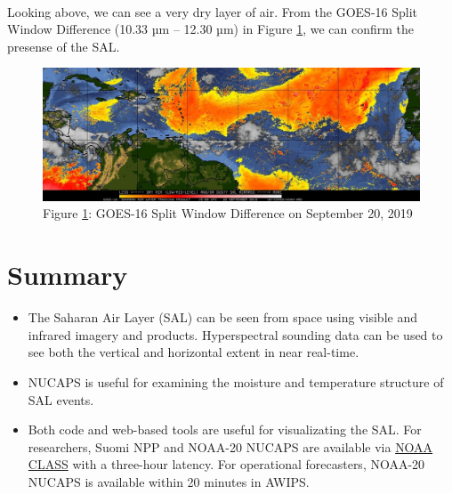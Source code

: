 \documentclass[11pt]{article}
\makeatletter
\def\maxwidth{\ifdim\Gin@nat@width>\linewidth\linewidth
    \else\Gin@nat@width\fi}
\let\Oldincludegraphics\includegraphics
\renewcommand{\includegraphics}[1]{\Oldincludegraphics[width=.8\maxwidth]{#1}}
\providecommand{\tightlist}{%
      \setlength{\itemsep}{0pt}\setlength{\parskip}{0pt}}
\makeatother
\begin{document}
    \begin{center}
    \end{center}
    { \hspace*{\fill} \\}

    Looking above, we can see a very dry layer of air. From the GOES-16
Split Window Difference (10.33 µm -- 12.30 µm) in Figure \ref{fig:split}, we can confirm the
presense of the SAL.

\begin{figure}[h]
\centering
\includegraphics{images/20180920.15.NWAtlantic.SALgoes16split.png}
\caption{Figure \ref{fig:split}: GOES-16 Split Window Difference on September 20, 2019}
\label{fig:split}
\end{figure}

\section{Summary}\label{conclusions}

\begin{itemize}
  \tightlist
  \item
    The Saharan Air Layer (SAL) can be seen from space using visible and infrared imagery and products. Hyperspectral sounding data can be used to see both the vertical and horizontal extent in near real-time.
  \item
    NUCAPS is useful for examining the moisture and temperature structure of SAL events.
  \item
    Both code and web-based tools are useful for visualizating the SAL. For researchers, Suomi NPP and NOAA-20 NUCAPS are available via \href{https://www.bou.class.noaa.gov/saa/products/search?sub_id=0\&datatype_family=JPSS_SND\&submit.x=24\&submit.y=7}{NOAA
    CLASS} with a three-hour latency. For operational forecasters, NOAA-20 NUCAPS is available within 20 minutes in AWIPS.
  \end{itemize}
\end{document}
